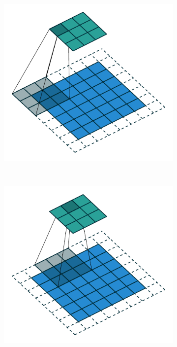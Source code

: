 \begin{figure}[!ht]
	\centering
	\begin{subfigure}{0.2\textwidth}
		\includegraphics[scale=0.5]{Figures/chapter_background/convolution_operator/padding_strides_odd_00.pdf}
	\end{subfigure}
	~ %
	\begin{subfigure}{0.2\textwidth}
	\includegraphics[scale=0.5]{Figures/chapter_background/convolution_operator/padding_strides_odd_01.pdf}
	\end{subfigure}
	~ %

\end{figure}
